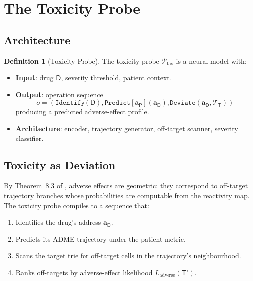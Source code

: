 \documentclass[11pt,twocolumn,a4paper]{article}
\theoremstyle{definition}
\newtheorem{definition}[theorem]{Definition}
\theoremstyle{remark}
\newcommand{\probe}{\mathcal{P}}
\newcommand{\drugaddr}{\mathbf{a}_{\mathsf{D}}}
\newcommand{\patientaddr}{\mathbf{a}_{\mathsf{P}}}
\begin{document}
\section{The Toxicity Probe}
\label{sec:toxicity_probe}

\subsection{Architecture}

\begin{definition}[Toxicity Probe]
\label{def:toxicity_probe}
The toxicity probe $\probe_{\mathrm{tox}}$ is a neural model with:
\begin{itemize}[nosep,leftmargin=*]
\item \textbf{Input}: drug $\mathsf{D}$, severity threshold, patient context.
\item \textbf{Output}: operation sequence
\begin{equation*}
o = (\texttt{Identify}(\mathsf{D}), \texttt{Predict}[\patientaddr](\drugaddr), \texttt{Deviate}(\drugaddr, \mathcal{T}_\mathsf{T}))
\end{equation*}
producing a predicted adverse-effect profile.
\item \textbf{Architecture}: encoder, trajectory generator, off-target scanner, severity classifier.
\end{itemize}
\end{definition}

\subsection{Toxicity as Deviation}

By Theorem~8.3 of \citep{sachikonye2025e}, adverse effects are geometric: they correspond to off-target trajectory branches whose probabilities are computable from the reactivity map. The toxicity probe compiles to a sequence that:
\begin{enumerate}[nosep,label=(\alph*)]
\item Identifies the drug's address $\drugaddr$.
\item Predicts its ADME trajectory under the patient-metric.
\item Scans the target trie for off-target cells in the trajectory's neighbourhood.
\item Ranks off-targets by adverse-effect likelihood $L_{\mathrm{adverse}}(\mathsf{T}')$.
\end{enumerate}
\end{document}
